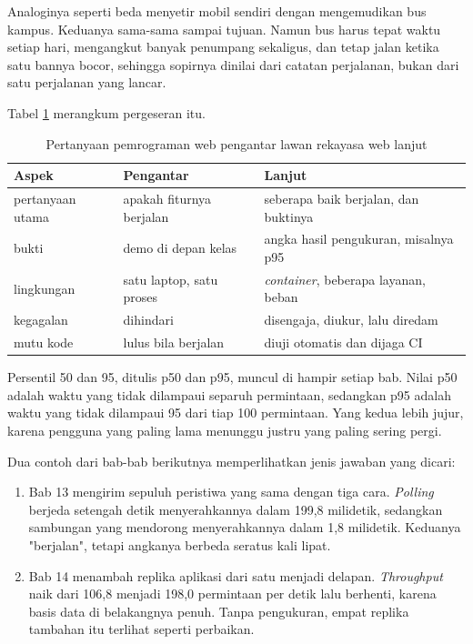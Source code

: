 Analoginya seperti beda menyetir mobil sendiri dengan mengemudikan bus kampus.
Keduanya sama-sama sampai tujuan. Namun bus harus tepat waktu setiap hari,
mengangkut banyak penumpang sekaligus, dan tetap jalan ketika satu bannya
bocor, sehingga sopirnya dinilai dari catatan perjalanan, bukan dari satu
perjalanan yang lancar.

Tabel \ref{tab:posisi01} merangkum pergeseran itu.

\begin{table}[!htb]
  \centering
  \caption{Pertanyaan pemrograman web pengantar lawan rekayasa web lanjut}
  \label{tab:posisi01}
  \begin{tabularx}{\textwidth}{lXX}
    \hline
    \textbf{Aspek} & \textbf{Pengantar} & \textbf{Lanjut} \\
    \hline
    pertanyaan utama & apakah fiturnya berjalan & seberapa baik berjalan, dan buktinya \\
    \hline
    bukti & demo di depan kelas & angka hasil pengukuran, misalnya p95 \\
    \hline
    lingkungan & satu laptop, satu proses & \textit{container}, beberapa layanan, beban \\
    \hline
    kegagalan & dihindari & disengaja, diukur, lalu diredam \\
    \hline
    mutu kode & lulus bila berjalan & diuji otomatis dan dijaga CI \\
    \hline
  \end{tabularx}
\end{table}

Persentil 50 dan 95, ditulis p50 dan p95, muncul di hampir setiap bab. Nilai
p50 adalah waktu yang tidak dilampaui separuh permintaan, sedangkan p95 adalah
waktu yang tidak dilampaui 95 dari tiap 100 permintaan. Yang kedua lebih
jujur, karena pengguna yang paling lama menunggu justru yang paling sering
pergi.

Dua contoh dari bab-bab berikutnya memperlihatkan jenis jawaban yang dicari:
\begin{enumerate}
  \item Bab 13 mengirim sepuluh peristiwa yang sama dengan tiga cara.
        \textit{Polling} berjeda setengah detik menyerahkannya dalam 199,8
        milidetik, sedangkan sambungan yang mendorong menyerahkannya dalam
        1,8 milidetik. Keduanya "berjalan", tetapi angkanya berbeda seratus
        kali lipat.
  \item Bab 14 menambah replika aplikasi dari satu menjadi delapan.
        \textit{Throughput} naik dari 106,8 menjadi 198,0 permintaan per
        detik lalu berhenti, karena basis data di belakangnya penuh. Tanpa
        pengukuran, empat replika tambahan itu terlihat seperti perbaikan.
\end{enumerate}

